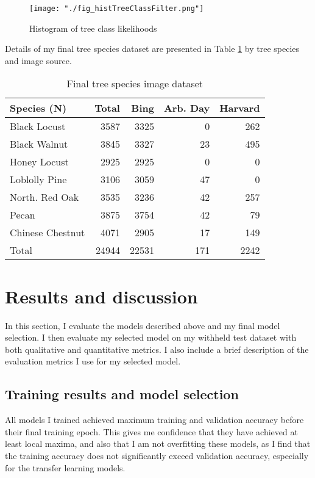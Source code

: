 \documentclass[10pt,twocolumn,letterpaper]{article}
\begin{document}
\begin{figure}[!htbp]
  \centering
  \texttt{[image: "./fig\_histTreeClassFilter.png"]}
  \caption{\label{fig:hist_tree_class} Histogram of tree class likelihoods}
\end{figure}


Details of my final tree species dataset are presented in Table \ref{tab:dataset_final} by tree species and image source.

\begin{table}[!htbp]
  \begin{center}
    \small
  \begin{tabular}{|l|r|r|r|r|}
  \hline
  Species (N) & Total & Bing & Arb. Day & Harvard \\
  \hline\hline
  Black Locust & 3587 & 3325 & 0 & 262\\
   Black Walnut & 3845 & 3327 & 23 & 495\\
   Honey Locust & 2925 & 2925 & 0 & 0\\
   Loblolly Pine & 3106 & 3059 & 47 & 0\\
   North. Red Oak & 3535 & 3236 & 42 & 257\\
   Pecan & 3875 & 3754 & 42 & 79\\
   Chinese Chestnut & 4071 & 2905 & 17 & 149\\
   \hline\hline
   Total & 24944 & 22531 & 171 & 2242\\
  \hline
  \end{tabular}
  \end{center}
  \caption{\label{tab:dataset_final} Final tree species image dataset}
  \end{table}

\section{Results and discussion}
\label{sec:results}
In this section, I evaluate the models described above and my final model selection. I then evaluate my selected model on my withheld test dataset with both qualitative and quantitative metrics. I also include a brief description of the evaluation metrics I use for my selected model. 

\subsection{Training results and model selection}
All models I trained achieved maximum training and validation accuracy before their final training epoch. This gives me confidence that they have achieved at least local maxima, and also that I am not overfitting these models, as I find that the training accuracy does not significantly exceed validation accuracy, especially for the transfer learning models.
\end{document}
